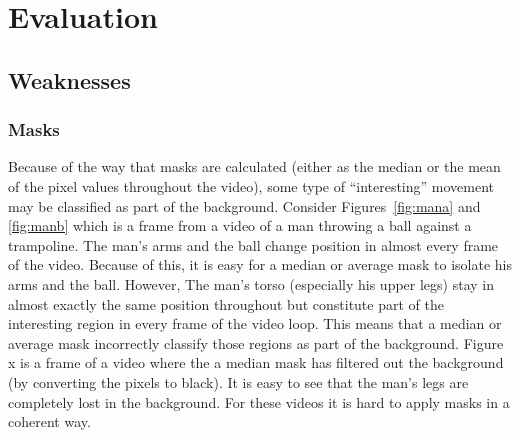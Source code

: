 \section{Evaluation}
\label{sec:Evaluation}
\subsection{Weaknesses}
\label{sec:Weaknesses}
\subsubsection{Masks}
\label{sec:MasksWeaknesses}

Because of the way that masks are calculated (either as the median or the mean of the pixel values throughout the video), some type of ``interesting'' movement may be classified as part of the background. Consider Figures~\ref{fig:mana} and \ref{fig:manb} which is a frame from a video of a man throwing a ball against a trampoline. The man's arms and the ball change position in almost every frame of the video. Because of this, it is easy for a median or average mask to isolate his arms and the ball. However, The man's torso (especially his upper legs) stay in almost exactly the same position throughout but constitute part of the interesting region in every frame of the video loop. This means that a median or average mask incorrectly classify those regions as part of the background. Figure x is a frame of a video where the a median mask has filtered out the background (by converting the pixels to black). It is easy to see that the man's legs are completely lost in the background. For these videos it is hard to apply masks in a coherent way. 
